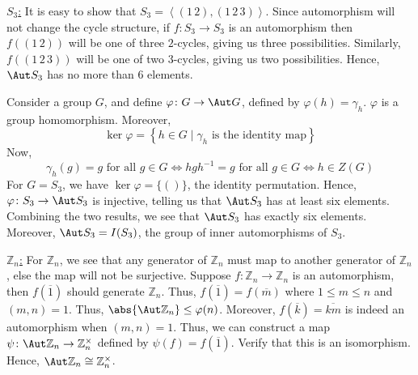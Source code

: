 \begin{enumerate}
\begin{solution}
        \medskip
        
        \underline{$S_3$:} It is easy to show that $S_3 = \left\langle (1 \, 2), (1 \, 2 \, 3) \right\rangle$. Since automorphism will not change the cycle structure, if $f \colon S_3 \to S_3$ is an automorphism then $f\left((1 \, 2)\right)$ will be one of three $2$-cycles, giving us three possibilities. Similarly, $f\left( (1 \, 2 \, 3) \right)$ will be one of two $3$-cycles, giving us two possibilities. Hence, $\Aut S_3$ has no more than $6$ elements. 
        
       Consider a group $G$, and define $\varphi \colon G \to \Aut G$, defined by $\varphi(h) = \gamma_h$. $\varphi$ is a group homomorphism. Moreover, 
       \[
        \ker\varphi = \left\{ h \in G \mid \gamma_h \text{ is the identity map} \right\}
       \]
       Now,
       \[
            \gamma_h(g) = g \text{ for all } g \in G\iff hgh^{-1} = g \text{ for all }g \in G \iff h \in Z(G)
       \]
       For $G = S_3$, we have $\ker\varphi = \{ () \}$, the identity permutation. Hence, $\varphi \colon S_3 \to \Aut S_3$ is injective, telling us that $\Aut S_3$ has at least six elements. Combining the two results, we see that $\Aut S_3$ has exactly six elements. Moreover, $\Aut S_3 = I(S_3)$, the group of inner automorphisms of $S_3$.
       
       \medskip
       
       \underline{$\mathbb{Z}_n$:} For $\mathbb{Z}_n$, we see that any generator of $\mathbb{Z}_n$ must map to another generator of $\mathbb{Z}_n$, else the map will not be surjective. Suppose $f \colon \mathbb{Z}_n \to \mathbb{Z}_n$ is an automorphism, then $f(\overline{1})$ should generate $\mathbb{Z}_n$. Thus, $f(\overline{1}) = f(\overline{m})$ where $1 \leq m \leq n$ and $(m,n) = 1$. Thus, $\abs{\Aut\mathbb{Z}_n} \leq \varphi(n)$. Moreover, $f(\overline{k}) = \overline{km}$ is indeed an automorphism when $(m,n) = 1$. Thus, we can construct a map $\psi \colon \Aut\mathbb{Z}_n \to \mathbb{Z}_n^{\times}$ defined by $\psi(f) = f(\overline{1})$. Verify that this is an isomorphism. Hence, $\Aut\mathbb{Z}_n \cong \mathbb{Z}_n^{\times}$.
    \end{solution}
\end{enumerate}